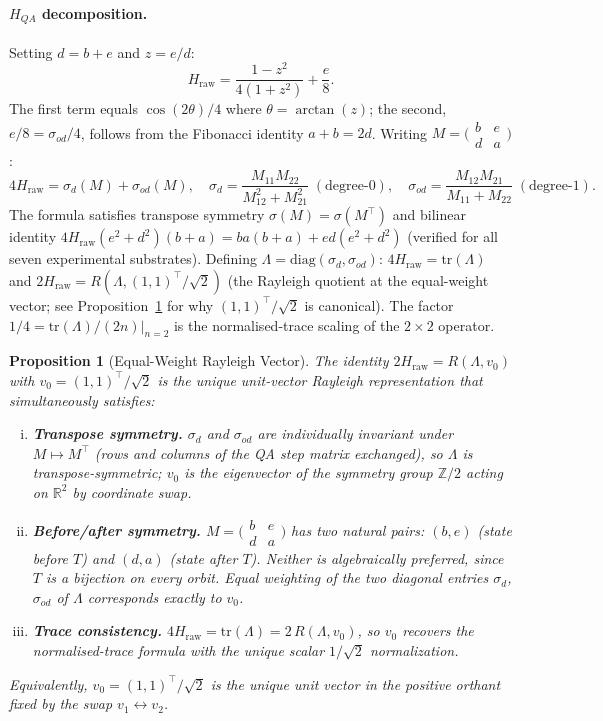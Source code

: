 \documentclass[11pt]{article}
\newtheorem{proposition}[theorem]{Proposition}
\theoremstyle{definition}
\theoremstyle{remark}
\newcommand{\hraw}{H_{\mathrm{raw}}}
\begin{document}
\paragraph{$H_{QA}$ decomposition.}
Setting $d=b+e$ and $z=e/d$:
\[
  \hraw = \frac{1-z^2}{4(1+z^2)} + \frac{e}{8}.
\]
The first term equals $\cos(2\theta)/4$ where $\theta=\arctan(z)$; the second,
$e/8=\sigma_{od}/4$, follows from the Fibonacci identity $a+b=2d$. Writing
$M=\bigl(\begin{smallmatrix}b&e\\d&a\end{smallmatrix}\bigr)$:
\[
  4\hraw = \sigma_d(M)+\sigma_{od}(M),\quad
  \sigma_d=\frac{M_{11}M_{22}}{M_{12}^2+M_{21}^2}\;(\text{degree-0}),\quad
  \sigma_{od}=\frac{M_{12}M_{21}}{M_{11}+M_{22}}\;(\text{degree-1}).
\]
The formula satisfies transpose symmetry $\sigma(M)=\sigma(M^\top)$ and bilinear
identity $4\hraw(e^2+d^2)(b+a)=ba(b+a)+ed(e^2+d^2)$ (verified for all seven
experimental substrates). Defining $\Lambda=\mathrm{diag}(\sigma_d,\sigma_{od})$:
$4\hraw=\mathrm{tr}(\Lambda)$ and $2\hraw=R(\Lambda,(1,1)^\top/\sqrt{2})$ (the
Rayleigh quotient at the equal-weight vector;
see Proposition~\ref{prop:v0} for why $(1,1)^\top/\!\sqrt{2}$ is canonical).
The factor $1/4=\mathrm{tr}(\Lambda)/(2n)|_{n=2}$
is the normalised-trace scaling of the $2\times 2$ operator.

\begin{proposition}[Equal-Weight Rayleigh Vector]
\label{prop:v0}
The identity $2\hraw=R(\Lambda,v_0)$ with $v_0=(1,1)^\top/\!\sqrt{2}$ is the unique
unit-vector Rayleigh representation that simultaneously satisfies:
\begin{enumerate}[(i)]
  \item \textbf{Transpose symmetry.} $\sigma_d$ and $\sigma_{od}$ are individually
    invariant under $M\mapsto M^\top$ (rows and columns of the QA step matrix exchanged),
    so $\Lambda$ is transpose-symmetric; $v_0$ is the eigenvector of the symmetry
    group $\mathbb{Z}/2$ acting on $\mathbb{R}^2$ by coordinate swap.
  \item \textbf{Before/after symmetry.} $M=\bigl(\begin{smallmatrix}b&e\\d&a\end{smallmatrix}\bigr)$
    has two natural pairs: $(b,e)$ (state before $T$) and $(d,a)$ (state after $T$).
    Neither is algebraically preferred, since $T$ is a bijection on every orbit.
    Equal weighting of the two diagonal entries $\sigma_d$, $\sigma_{od}$ of $\Lambda$
    corresponds exactly to $v_0$.
  \item \textbf{Trace consistency.} $4\hraw=\mathrm{tr}(\Lambda)=2\,R(\Lambda,v_0)$,
    so $v_0$ recovers the normalised-trace formula with the unique
    scalar $1/\!\sqrt{2}$ normalization.
\end{enumerate}
Equivalently, $v_0=(1,1)^\top/\!\sqrt{2}$ is the unique unit vector in the positive
orthant fixed by the swap $v_1\leftrightarrow v_2$.
\end{proposition}
\end{document}
